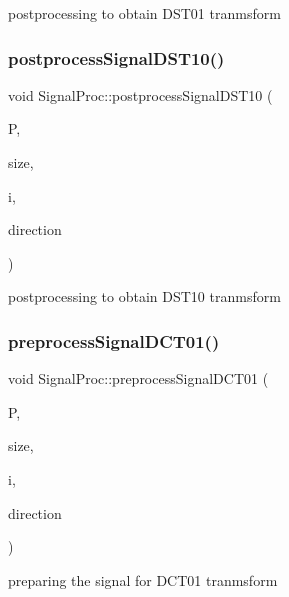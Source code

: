 postprocessing to obtain D\+S\+T01 tranmsform \mbox{\label{classSignalProc_ada9700d179aee4007811a3aa61a3fad5}} 
\subsubsection{\texorpdfstring{postprocess\+Signal\+D\+S\+T10()}{postprocessSignalDST10()}}
{\footnotesize\ttfamily void Signal\+Proc\+::postprocess\+Signal\+D\+S\+T10 (\begin{DoxyParamCaption}\item[{\mbox{\hyperlink{classChunkedArray}{Chunked\+Array}} \&}]{P,  }\item[{const int}]{size,  }\item[{const int}]{i,  }\item[{const int}]{direction }\end{DoxyParamCaption})}

postprocessing to obtain D\+S\+T10 tranmsform \mbox{\label{classSignalProc_a524c586ab4356908dfc87f049a202285}} 
\subsubsection{\texorpdfstring{preprocess\+Signal\+D\+C\+T01()}{preprocessSignalDCT01()}}
{\footnotesize\ttfamily void Signal\+Proc\+::preprocess\+Signal\+D\+C\+T01 (\begin{DoxyParamCaption}\item[{\mbox{\hyperlink{classChunkedArray}{Chunked\+Array}} \&}]{P,  }\item[{const int}]{size,  }\item[{const int}]{i,  }\item[{const int}]{direction }\end{DoxyParamCaption})}

preparing the signal for D\+C\+T01 tranmsform \mbox{\label{classSignalProc_abe604e9fda0e105619688c7524c96137}} 
